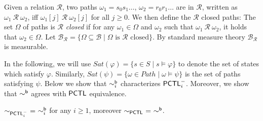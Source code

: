 \documentclass{LMCS}
\def\phi{\varphi}
\newcommand{\PCTL}{{\sf PCTL}}
\newcommand{\iBSB}[1]{\sim_{#1}^{{\sf b}}}
\newcommand{\EPCTL}{\sim_{\PCTL}}
\newcommand{\iEPCTLM}[1]{\sim_{\PCTL^{-}_{#1}}}
\newcommand{\MC}[1]{\mathcal{#1}}
\newcommand{\MEASURE}{\mathit{Prob}}
\begin{document}
\iffalse
\begin{defi}\label{def:path bisimular}
Two paths $\omega_1=s_0s_1\ldots$ and $\omega_2=r_0r_1\ldots$ are
strong $i$-depth branching bisimilar, written as $\omega_1~\iBSB{i}~\omega_2$, iff
$\omega_1[j]~\iBSB{i}~\omega_2[j]$ for all $j\geq 0$.
\end{defi}
\fi


Given a relation $\MC{R}$, two paths $\omega_1=s_0s_1\ldots$, $\omega_2=r_0r_1\ldots$ are in $\MC{R}$, written as $\omega_1~\MC{R}~\omega_2$, iff $\omega_1[j]~\MC{R}~\omega_2[j]$ for all $j\geq 0$.
We then define the $\MC{R}$ closed paths:
The set $\Omega$ of paths is $\MC{R}$ \emph{closed} if for any
$\omega_1\in\Omega$ and $\omega_2$ such that $\omega_1~\MC{R}~\omega_2$,
it holds that $\omega_2\in\Omega$. Let
$\mathcal{B}_{\MC{R}}=\{\Omega\subseteq\mathcal{B}\mid
\Omega\text{ is $\MC{R}$ closed}\}$. By standard measure theory
$\mathcal{B}_{\MC{R}}$ is measurable.


\iffalse
\begin{lem}\label{lem:preservation of bisimulation closed event branching}
$s~\iBSB{i}~r$ implies that for each scheduler $\sigma$ and each
$\Omega\in\mathcal{B}_{\iBSB{i}}$ where $\Omega=\mathop{\cup}\limits_{0\leq k<j}C^kC'$ for two $\iBSB{i}$ closed sets $C,C'$ with $j\leq i$, there exists $\sigma'$ such that
$\MEASURE_{\sigma',r}(C_{\Omega})\leq\MEASURE_{\sigma,s}(C_{\Omega})$ and vice versa.
\end{lem}
\begin{proof}
Note that by (\ref{eq:definition of transition branching}) for any $\Omega\in\mathcal{B}_{\iBSB{i}}$, if there exists $j<i$ and $\iBSB{i}$ closed sets $C,C'$ such that $\Omega=\mathop{\cup}\limits_{0\leq k\leq j}C^kC'$, then $\MEASURE_{\sigma,s}(C,C',j+1,s)=\MEASURE_{\sigma,s}(C_{\Omega})$. The following proof is straightforward from Definition~\ref{def:index strong bisimulation branching}.
\end{proof}
\fi


In the following, we will use $\mathit{Sat}(\phi)=\{s\in S\mid s\models \phi\}$ to denote the set of states which satisfy $\phi$.
Similarly, $\mathit{Sat}(\psi)=\{\omega\in\mathit{Path}\mid\omega\models\psi\}$ is the set of paths satisfying $\psi$.
Below we show that $\iBSB{i}$  characterizes $\PCTL^{-}_i$. Moreover, we show that $\iBSB{}$ agrees with $\PCTL$ equivalence.
\begin{thm}\label{thm:relation of equivalence branching}
$\iEPCTLM{i}~=~\iBSB{i}$ for any $i\geq 1$, moreover  $\EPCTL\ =\ \iBSB{}$.
\end{thm}
\end{document}
